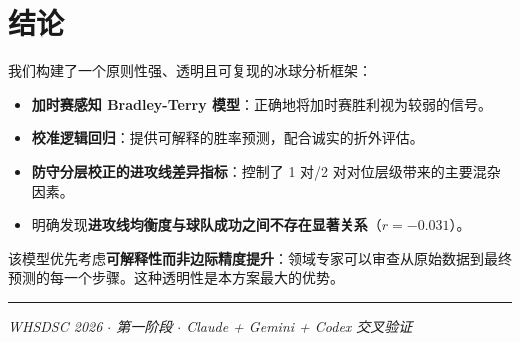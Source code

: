 \documentclass[11pt, a4paper]{article}
\begin{document}
\section{结论}
\label{sec:conclusion}

我们构建了一个原则性强、透明且可复现的冰球分析框架：

\begin{itemize}
    \item \textbf{加时赛感知 Bradley-Terry 模型}：正确地将加时赛胜利视为较弱的信号。
    \item \textbf{校准逻辑回归}：提供可解释的胜率预测，配合诚实的折外评估。
    \item \textbf{防守分层校正的进攻线差异指标}：控制了 1 对/2 对对位层级带来的主要混杂因素。
    \item 明确发现\textbf{进攻线均衡度与球队成功之间不存在显著关系}（$r = -0.031$）。
\end{itemize}

该模型优先考虑\textbf{可解释性而非边际精度提升}：领域专家可以审查从原始数据到最终预测的每一个步骤。这种透明性是本方案最大的优势。

\vspace{0.5cm}
\hrule
\vspace{0.3cm}
\begin{center}
\small\textit{WHSDSC 2026 $\cdot$ 第一阶段 $\cdot$ Claude + Gemini + Codex 交叉验证}
\end{center}
\end{document}
